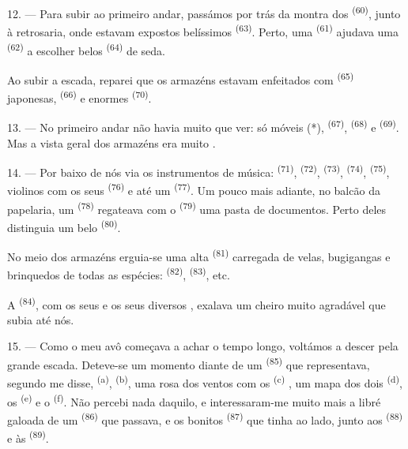 12. --- Para subir ao primeiro andar, passámos por trás da montra dos
 \textsuperscript{(60)}, junto à retrosaria, onde estavam
expostos belíssimos  \textsuperscript{(63)}. Perto, uma
 \textsuperscript{(61)} ajudava uma 
\textsuperscript{(62)} a escolher belos  \textsuperscript{(64)} de seda.

Ao subir a escada, reparei que os armazéns estavam enfeitados com
 \textsuperscript{(65)} japonesas, 
\textsuperscript{(66)} e enormes  \textsuperscript{(70)}.

13. --- No primeiro andar não havia muito que ver: só móveis (*),
 \textsuperscript{(67)},  \textsuperscript{(68)} e
 \textsuperscript{(69)}. Mas a vista geral dos armazéns
era muito .

14. --- Por baixo de nós via os instrumentos de música: 
\textsuperscript{(71)},  \textsuperscript{(72)}, 
\textsuperscript{(73)},  \textsuperscript{(74)}, 
\textsuperscript{(75)}, violinos com os seus  \textsuperscript{(76)} e até
um  \textsuperscript{(77)}. Um pouco mais adiante, no balcão da
papelaria, um  \textsuperscript{(78)} regateava com o
 \textsuperscript{(79)} uma pasta de documentos. Perto deles
distinguia um belo  \textsuperscript{(80)}.

No meio dos armazéns erguia-se uma alta 
\textsuperscript{(81)} carregada de velas, bugigangas e brinquedos de todas as
espécies:  \textsuperscript{(82)}, 
\textsuperscript{(83)}, etc.

A  \textsuperscript{(84)}, com os seus  e os
seus diversos , exalava um cheiro muito agradável que
subia até nós.

\VUsaut{3.4mm}
\VUsaut{2.8mm}

15. --- Como o meu avô começava a achar o tempo longo, voltámos a descer
pela grande escada. Deteve-se um momento diante de um  \textsuperscript{(85)} que representava, segundo me disse,
 \textsuperscript{(a)}, 
\textsuperscript{(b)}, uma rosa dos ventos com os 
\textsuperscript{(c)} , um mapa dos dois
 \textsuperscript{(d)}, os  \textsuperscript{(e)} e o
 \textsuperscript{(f)}. Não percebi nada daquilo, e
interessaram-me muito mais a libré galoada de um 
\textsuperscript{(86)} que passava, e os bonitos 
\textsuperscript{(87)} que tinha ao lado, junto aos 
\textsuperscript{(88)} e às  \textsuperscript{(89)}.

